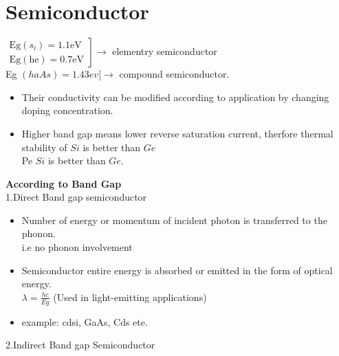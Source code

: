 \section{Semiconductor}
$\left.\begin{array}{l}\mathrm{Eg}\left(s_{i}\right)=1.1 \mathrm{eV} \\ \mathrm{Eg}(\mathrm{he})=0.7 \mathrm{eV}\end{array}\right] \rightarrow$
elementry semiconductor\\
Eg $(haAs )=1.43 ev ]\rightarrow$ compound semiconductor.
\begin{itemize}	\item Their conductivity can be modified according to application by changing doping concentration.
	\item Higher band gap means lower reverse saturation current, therfore thermal stability of $Si$ is better than $Ge$\\
	Pe ${Si}$ is better than $Ge$.
\end{itemize}
\textbf{According to Band Gap}\\
1.\quad Direct Band gap semiconductor
\begin{itemize}
	\item Number of energy or momentum of incident photon is transferred to the phonon.\\
	i.e no phonon involvement
	\item Semiconductor entire energy is absorbed or emitted in the form of optical energy.\\
	$\lambda=\frac{h c}{E g}$ (Used in light-emitting applications)\\
	\item example: cdsi, GaAs, Cds ete.
\end{itemize}
2.Indirect Band gap Semiconductor
